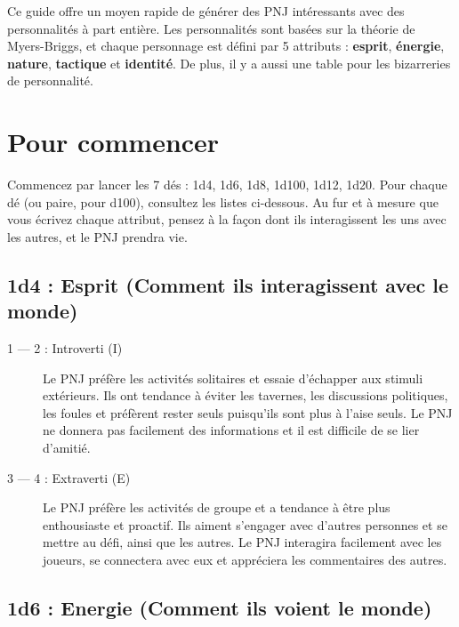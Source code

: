 \documentclass{article}
\begin{document}
\title{\vspace{-0.5cm}{\Huge Créer des PNJ ayant une personnalité} \vspace{-1cm}}

\date{}

\maketitle

Ce guide offre un moyen rapide de générer des PNJ intéressants avec des personnalités à part entière. Les personnalités sont basées sur la théorie de Myers-Briggs, et chaque personnage est défini par 5 attributs : \textbf{esprit}, \textbf{énergie}, \textbf{nature}, \textbf{tactique} et \textbf{identité}. De plus, il y a aussi une table pour les bizarreries de personnalité.

\section*{Pour commencer}
Commencez par lancer les 7 dés : 1d4, 1d6, 1d8, 1d100, 1d12, 1d20. Pour chaque dé (ou paire, pour d100), consultez les listes ci-dessous. Au fur et à mesure que vous écrivez chaque attribut, pensez à la façon dont ils interagissent les uns avec les autres, et le PNJ prendra vie.

\subsection*{1d4 : Esprit (Comment ils interagissent avec le monde)}

\begin{description}
	\item[1 --- 2 : Introverti (I)] Le PNJ préfère les activités solitaires et essaie d'échapper aux stimuli extérieurs. Ils ont tendance à éviter les tavernes, les discussions politiques, les foules et préfèrent rester seuls puisqu'ils sont plus à l'aise seuls. Le PNJ ne donnera pas facilement des informations et il est difficile de se lier d'amitié.
	\item[3 --- 4 : Extraverti (E)] Le PNJ préfère les activités de groupe et a tendance à être plus enthousiaste et proactif. Ils aiment s'engager avec d'autres personnes et se mettre au défi, ainsi que les autres. Le PNJ interagira facilement avec les joueurs, se connectera avec eux et appréciera les commentaires des autres.
\end{description}

\subsection*{1d6 : Energie (Comment ils voient le monde)}
\end{document}

